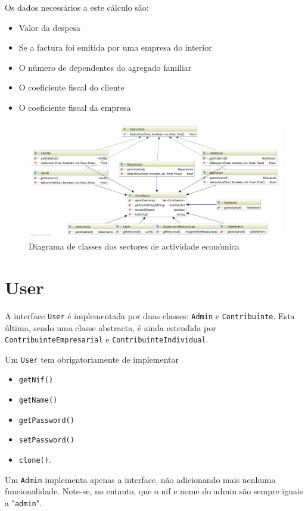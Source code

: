\documentclass[12pt,a4paper]{report}
\begin{document}
    Os dados necessários a este cálculo são:
    \begin{itemize}
        \item Valor da despesa
        \item Se a factura foi emitida por uma empresa do interior
        \item O número de dependentes do agregado familiar
        \item O coeficiente fiscal do cliente
        \item O coeficiente fiscal da empresa
    \end{itemize}

    \begin{figure}[h]
        \centering
        \includegraphics[width=\textwidth]{./images/econSectors.png}
        \caption{Diagrama de classes dos sectores de actividade económica}
        \label{fig:sectors}
    \end{figure}

\pagebreak

    \section{User}
    A interface \texttt{User} é implementada por duas classes:
    \texttt{Admin} e \texttt{Contribuinte}. Esta última, sendo
    uma classe abstracta, é ainda estendida por
    \texttt{ContribuinteEmpresarial} e
    \texttt{ContribuinteIndividual}.

    Um \texttt{User} tem obrigatoriamente de implementar
    \begin{multicols}{3}
    \begin{itemize}
        \item \texttt{getNif()}
        \item \texttt{getName()}
        \item \texttt{getPassword()}
        \item \texttt{setPassword()}
        \item \texttt{clone()}.
    \end{itemize}
    \end{multicols}
    Um \texttt{Admin} implementa apenas a interface, não adicionando mais
    nenhuma funcionalidade. Note-se, no entanto, que o nif e nome do admin são
    sempre iguais a "\texttt{admin}".
\end{document}
